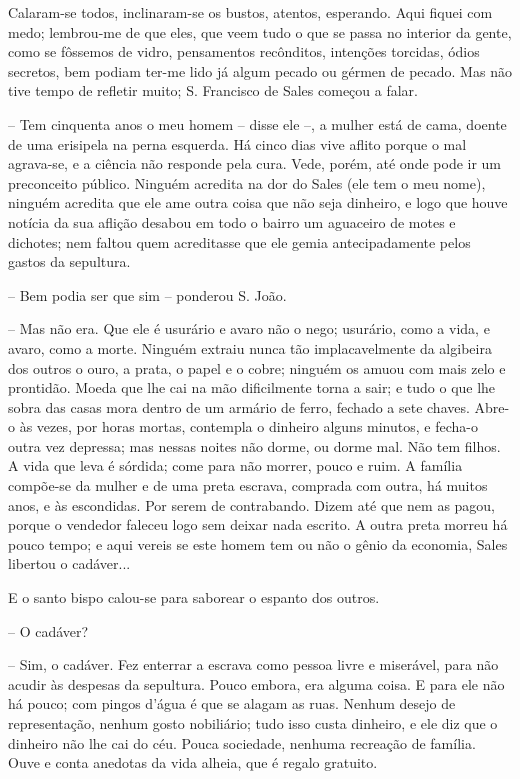 Calaram-se todos, inclinaram-se os bustos, atentos, esperando. Aqui
fiquei com medo; lembrou-me de que eles, que veem tudo o que se passa no
interior da gente, como se fôssemos de vidro, pensamentos recônditos,
intenções torcidas, ódios secretos, bem podiam ter-me lido já algum
pecado ou gérmen de pecado. Mas não tive tempo de refletir muito; S.
Francisco de Sales começou a falar.

-- Tem cinquenta anos o meu homem -- disse ele --, a mulher está de
cama, doente de uma erisipela na perna esquerda. Há cinco dias vive
aflito porque o mal agrava-se, e a ciência não responde pela cura. Vede,
porém, até onde pode ir um preconceito público. Ninguém acredita na dor
do Sales (ele tem o meu nome), ninguém acredita que ele ame outra coisa
que não seja dinheiro, e logo que houve notícia da sua aflição desabou
em todo o bairro um aguaceiro de motes e dichotes; nem faltou quem
acreditasse que ele gemia antecipadamente pelos gastos da sepultura.

-- Bem podia ser que sim -- ponderou S. João.

-- Mas não era. Que ele é usurário e avaro não o nego; usurário, como a
vida, e avaro, como a morte. Ninguém extraiu nunca tão implacavelmente
da algibeira dos outros o ouro, a prata, o papel e o cobre; ninguém os
amuou com mais zelo e prontidão. Moeda que lhe cai na mão dificilmente
torna a sair; e tudo o que lhe sobra das casas mora dentro de um armário
de ferro, fechado a sete chaves. Abre-o às vezes, por horas mortas,
contempla o dinheiro alguns minutos, e fecha-o outra vez depressa; mas
nessas noites não dorme, ou dorme mal. Não tem filhos. A vida que leva é
sórdida; come para não morrer, pouco e ruim. A família compõe-se da
mulher e de uma preta escrava, comprada com outra, há muitos anos, e às
escondidas. Por serem de contrabando. Dizem até que nem as pagou, porque
o vendedor faleceu logo sem deixar nada escrito. A outra preta morreu há
pouco tempo; e aqui vereis se este homem tem ou não o gênio da economia,
Sales libertou o cadáver...

E o santo bispo calou-se para saborear o espanto dos outros.

-- O cadáver?

-- Sim, o cadáver. Fez enterrar a escrava como pessoa livre e miserável,
para não acudir às despesas da sepultura. Pouco embora, era alguma
coisa. E para ele não há pouco; com pingos d'água é que se alagam as
ruas. Nenhum desejo de representação, nenhum gosto nobiliário; tudo isso
custa dinheiro, e ele diz que o dinheiro não lhe cai do céu. Pouca
sociedade, nenhuma recreação de família. Ouve e conta anedotas da vida
alheia, que é regalo gratuito.

